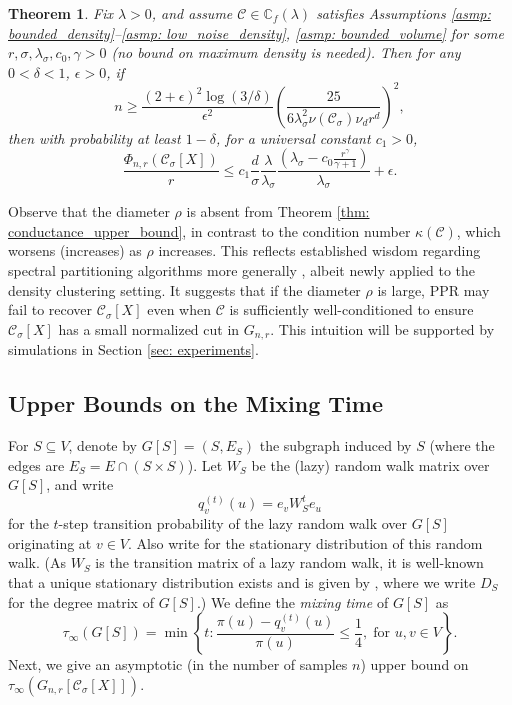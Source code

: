 \documentclass[11pt,twoside]{article}
\newtheorem{theorem}{Theorem}
\newcommand{\set}[1]{\left\{#1\right\}}
\newcommand{\vol}{\mathrm{vol}}
\newcommand{\1}{\mathbf{1}}
\newcommand{\Xbf}{X}             %
\newcommand{\Wbf}{W}
\newcommand{\Dbf}{D}
\newcommand{\Cbb}{\mathbb{C}}
\newcommand{\Cset}{\mathcal{C}}
\newcommand{\Csig}{\Cset_{\sigma}}
\begin{document}
\begin{theorem}
  \label{thm: conductance_upper_bound}
  Fix $\lambda > 0$, and assume $\Cset \in \Cbb_f(\lambda)$ satisfies
  Assumptions \ref{asmp: bounded_density}--\ref{asmp: low_noise_density}, 
  \ref{asmp: bounded_volume} for some $r, \sigma, \lambda_{\sigma}, c_0, \gamma
  > 0$ (no bound on maximum density is needed). Then for any $0 < \delta < 1$,
  $\epsilon > 0$, if 
  \begin{equation}
    \label{eqn: conductance_sample_complexity}
    n \geq \frac{(2+\epsilon)^2\log(3/\delta)}{\epsilon^2}\left(\frac{25}
      {6 \lambda_{\sigma}^2\nu(\Csig) \nu_d r^d}\right)^2,
  \end{equation}
  then with probability at least $1-\delta$, for a universal constant $c_1 > 0$,
  \begin{equation}
    \label{eqn: conductance_additive_error_bound}
    \frac{\Phi_{n,r}(\Csig[\Xbf])}{r} \leq c_1 \frac{d}{\sigma}
    \frac{\lambda}{\lambda_{\sigma}} \frac{(\lambda_{\sigma} -
      c_0\frac{r^{\gamma}}{\gamma+1})}{\lambda_{\sigma}} + \epsilon.
  \end{equation}
\end{theorem}
Observe that the diameter $\rho$ is absent from Theorem \ref{thm:
    conductance_upper_bound}, in contrast to the condition number
  $\kappa(\Cset)$, which worsens (increases) as $\rho$ increases. This
  reflects established wisdom regarding spectral partitioning
  algorithms more generally \citep{guattery1995, hein2010}, albeit newly applied
  to the density clustering setting. It suggests that if the diameter $\rho$ is
  large, PPR may fail to recover $\Csig[\Xbf]$ even when $\Cset$ is
  sufficiently well-conditioned to ensure $\Csig[\Xbf]$ has a small normalized
  cut in $G_{n,r}$. This intuition will be supported by simulations in Section
  \ref{sec: experiments}. 

\subsection{Upper Bounds on the Mixing Time} 
For $S \subseteq V$, denote by $G[S] = (S, E_S)$ the
subgraph induced by $S$ (where the edges are $E_S = E \cap (S \times S)$). Let
$\Wbf_S$ be the (lazy) random walk matrix over $G[S]$, and write  
$$
q_{v}^{(t)}(u) = e_v\Wbf_S^t e_u
$$
for the $t$-step transition probability of the lazy random walk over $G[S]$
originating at $v \in V$. Also write 
for the stationary distribution of this random walk.  (As
$\Wbf_S$ is the transition matrix of a lazy random walk, 
it is well-known that a unique stationary distribution exists and is given by 
\smash{$\pi(u) = (\Dbf_S)_{uu}/\vol(S; G[S])$}, where we write $\Dbf_S$ for the  
degree matrix of $G[S]$.) We define the \emph{mixing time} of $G[S]$ as
\begin{equation}
\label{eqn: mixing_time}
\tau_{\infty}(G[S]) = \min\set{ t: \frac{\pi(u) - q_{v}^{(t)}(u)}
  {\pi(u)} \leq \frac{1}{4}, \; \text{for $u,v \in V$}}. 
\end{equation}
Next, we give an asymptotic (in the number of samples $n$) upper bound on
$\tau_{\infty}(G_{n,r}[\Csig[\Xbf]])$.  
\end{document}

